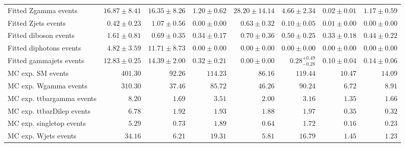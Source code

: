 \begin{table}
\begin{center}
{\begin{tabular*}{\textwidth}{@{\extracolsep{\fill}}lrrrrrrr}
        Fitted Zgamma events         & $16.87 \pm 8.41$          & $16.35 \pm 8.26$          & $1.20 \pm 0.62$          & $28.20 \pm 14.14$          & $4.66 \pm 2.34$          & $0.02 \pm 0.01$          & $1.17 \pm 0.59$              \\
        Fitted Zjets events         & $0.42 \pm 0.23$          & $1.07 \pm 0.56$          & $0.00 \pm 0.00$          & $0.63 \pm 0.32$          & $0.10 \pm 0.05$          & $0.01 \pm 0.00$          & $0.00 \pm 0.00$              \\
        Fitted diboson events         & $1.61 \pm 0.81$          & $0.69 \pm 0.35$          & $0.34 \pm 0.17$          & $0.70 \pm 0.36$          & $0.50 \pm 0.25$          & $0.33 \pm 0.18$          & $0.44 \pm 0.22$              \\
        Fitted diphotons events         & $4.82 \pm 3.59$          & $11.71 \pm 8.73$          & $0.00 \pm 0.00$          & $0.00 \pm 0.00$          & $0.00 \pm 0.00$          & $0.00 \pm 0.00$          & $0.00 \pm 0.00$              \\
        Fitted gammajets events         & $12.83 \pm 0.25$          & $14.39 \pm 2.00$          & $0.32 \pm 0.21$          & $0.00 \pm 0.00$          & $0.28_{-0.28}^{+0.49}$          & $0.10 \pm 0.04$          & $0.14 \pm 0.06$              \\
 \noalign{\smallskip}\hline\noalign{\smallskip}
MC exp. SM events              & $401.30$          & $92.26$          & $114.23$          & $86.16$          & $119.44$          & $10.47$          & $14.09$              \\
\noalign{\smallskip}\hline\noalign{\smallskip}
        MC exp. Wgamma events         & $310.30$          & $37.46$          & $85.72$          & $46.26$          & $90.24$          & $6.72$          & $8.91$              \\
        MC exp. ttbargamma events         & $8.20$          & $1.69$          & $3.51$          & $2.00$          & $3.16$          & $1.35$          & $1.66$              \\
        MC exp. ttbarDilep events         & $6.78$          & $1.92$          & $1.93$          & $1.88$          & $1.97$          & $0.35$          & $0.32$              \\
        MC exp. singletop events         & $5.29$          & $0.73$          & $1.89$          & $0.64$          & $1.72$          & $0.16$          & $0.23$              \\
        MC exp. Wjets events         & $34.16$          & $6.21$          & $19.31$          & $5.81$          & $16.79$          & $1.45$          & $1.23$              \\

\end{tabular*}}
\end{center}
\end{table}
